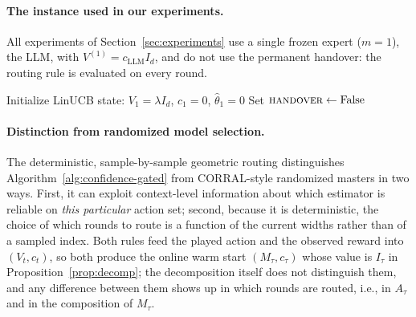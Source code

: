 \documentclass[anon]{alt2027} %
\begin{document}
\paragraph{The instance used in our experiments.}
All experiments of Section~\ref{sec:experiments} use a single frozen expert
($m=1$), the LLM, with $V^{(1)}=c_{\mathrm{LLM}}I_d$, and do not use the permanent handover:
the routing rule is evaluated on every round.

\begin{algorithm2e}[!htb]
\caption{Confidence-Gated Master over Frozen Policies and LinUCB}
\label{alg:confidence-gated}
\DontPrintSemicolon
\LinesNumbered
{}
Initialize LinUCB state: $V_1=\lambda I_d$, $c_1=0$, $\widehat{\theta}_1=0$\;
Set $\textsc{handover}\gets \mathrm{False}$\;
\end{algorithm2e}

\paragraph{Distinction from randomized model selection.}
The deterministic, sample-by-sample geometric routing distinguishes
Algorithm~\ref{alg:confidence-gated} from CORRAL-style randomized
masters in two ways. First, it can exploit context-level information
about which estimator is reliable on \emph{this particular} action
set; second, because it is deterministic, the choice of which rounds to route
is a function of the current widths rather than of a sampled index. Both
rules feed the played action and the observed reward into $(V_t,c_t)$, so
both produce the online warm start $(M_\tau,c_\tau)$ whose value is
$I_\tau$ in Proposition~\ref{prop:decomp}; the decomposition itself does not
distinguish them, and any difference between them shows up in which rounds
are routed, i.e., in $A_\tau$ and in the composition of $M_\tau$.
\end{document}
